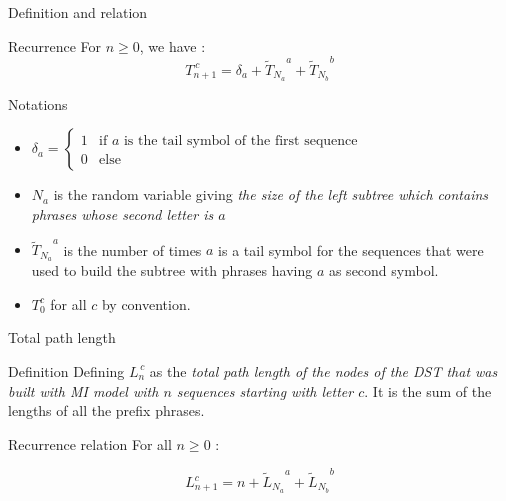 		\begin{frame}{Definition and relation}

			

			\begin{block}{Recurrence}
				For $n \geq 0$, we have :
					\[ \boxed{ T_{n+1}^{\,c} = \delta_a + 
											{{\tilde T}_{N_a}}^a
											+ {{\tilde T}_{N_b}}^b } \]
			\end{block}
		
			\begin{block}{ Notations }
				\begin{itemize}
				\item $\delta_a = 
							\begin{cases} 
								1 & \text{if $a$ is the tail symbol of the
										first sequence}\\
								0 & \text{else} 
							\end{cases}$

				\item $N_a$ is the 
				random variable giving \emph{the size of the left subtree 
				which contains phrases whose second letter is $a$}

				\item ${{\tilde T}_{N_a}}^a$ is the number of 
				times $a$ is a tail symbol for the sequences that were 
				used to  build the subtree with phrases having $a$ as second
				symbol.

				\item $T_0^c$ for all $c$ by convention.
			\end{itemize}
			\end{block}

		\end{frame}

		\begin{frame}{Total path length}

			\begin{block}{Definition}
				Defining $L_n^{\,c}$ as the \emph{total 
				path length of the nodes of the DST that was built with
				MI model with $n$ sequences starting with letter $c$}.
				It is the sum of the lengths of all the prefix phrases.
			\end{block}

			\begin{block}{Recurrence relation}
				For all $n\geq 0$ :

				\[
				\boxed{ 
					L_{n+1}^c = n + 
										{{\tilde L}_{N_a}}^a + 
										{{\tilde L}_{N_b}}^b
				}
				\]
			\end{block}
		\end{frame}


